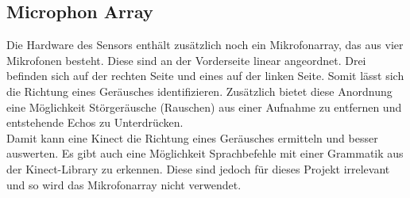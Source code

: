 	
\subsection{Microphon Array}
	Die Hardware des Sensors enthält zusätzlich noch ein Mikrofonarray, das aus vier Mikrofonen besteht.
	Diese sind an der Vorderseite linear angeordnet. Drei befinden sich auf der rechten Seite und eines
	auf der linken Seite. Somit lässt sich die Richtung eines Geräusches identifizieren. Zusätzlich bietet
	diese Anordnung eine Möglichkeit Störgeräusche (Rauschen) aus einer Aufnahme zu entfernen und entstehende
	Echos zu Unterdrücken. \\
	Damit kann eine Kinect die Richtung eines Geräusches ermitteln und besser auswerten. Es gibt auch eine
	Möglichkeit Sprachbefehle mit einer Grammatik aus der Kinect-Library zu erkennen. Diese sind jedoch für 
	dieses Projekt irrelevant und so wird das Mikrofonarray nicht verwendet.
	\cite{jana2012kinect}
